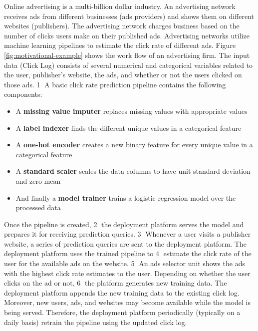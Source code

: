 Online advertising is a multi-billion dollar industry.
An advertising network receives ads from different businesses (ads providers) and shows them on different websites (publishers).
The advertising network charges business based on the number of clicks users make on their published ads.
Advertising networks utilize machine learning pipelines to estimate the click rate of different ads.
Figure \ref{fig:motivational-example} shows the work flow of an advertising firm.
The input data (Click Log) consists of several numerical and categorical variables related to the user, publisher's website,  the ads,  and whether or not the users clicked on those ads.
\textcircled{1} A basic click rate prediction pipeline contains the following components:
\begin{itemize}
\item A \textbf{missing value imputer} replaces missing values with appropriate values
\item A \textbf{label indexer} finds the different unique values in a categorical feature 
\item A \textbf{one-hot encoder} creates a new binary feature for every unique value in a categorical feature
\item A \textbf{standard scaler} scales the data columns to have unit standard deviation and zero mean
\item And finally a \textbf{model trainer} trains a logistic regression model over the processed data
\end{itemize}
Once the pipeline is created, \textcircled{2} the deployment platform serves the model and prepares it for receiving prediction queries.
\textcircled{3} Whenever a user visits a publisher website, a series of prediction queries are sent to the deployment platform.
The deployment platform uses the trained pipeline to \textcircled{4} estimate the click rate of the user for the available ads on the website.
\textcircled{5} An ads selector unit shows the ads with the highest click rate estimates to the user.
Depending on whether the user clicks on the ad or not, \textcircled{6} the platform generates new training data.
The deployment platform appends the new training data to the existing click log.
Moreover, new users, ads, and websites may become available while the model is being served.
Therefore, the deployment platform periodically (typically on a daily basis) retrain the pipeline using the updated click log.

